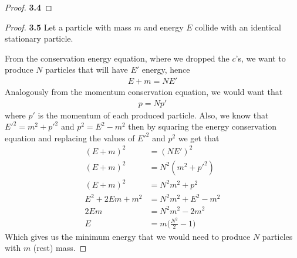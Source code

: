 \documentclass[11pt]{article}
\theoremstyle{definition}
\begin{document}
\begin{proof}{\textbf{3.4}}
\end{proof}
\cleardoublepage
\begin{proof}{\textbf{3.5}}
    Let a particle with mass $m$ and energy $E$ collide with an identical
    stationary particle.

    From the conservation energy equation, where we dropped the $c$'s,
    we want to produce $N$ particles that will have $E'$ energy, hence
    \begin{align*}
        E + m = NE'
    \end{align*}
    Analogously from the momentum conservation equation, we would want that
    \begin{align*}
        p = Np'
    \end{align*}
    where $p'$ is the momentum of each produced particle. Also, we know that
    $E'^2 = m^2 + p'^2 $ and $p^2 = E^2 - m^2$ then by squaring the energy
    conservation equation and replacing the values of $E'^2$ and $p^2$ we get
    that
    \begin{align*}
        (E + m)^2 &= (NE')^2\\
        (E + m)^2 &= N^2(m^2 + p'^2)\\
        (E + m)^2 &= N^2m^2 + p^2\\
        E^2 + 2Em + m^2 &= N^2m^2 + E^2 - m^2\\
        2Em &= N^2m^2 - 2m^2\\
        E &= m\bigg(\frac{N^2}{2} - 1\bigg)
    \end{align*}
    Which gives us the minimum energy that we would need to produce $N$
    particles with $m$ (rest) mass.
\end{proof}
\cleardoublepage
\end{document}
